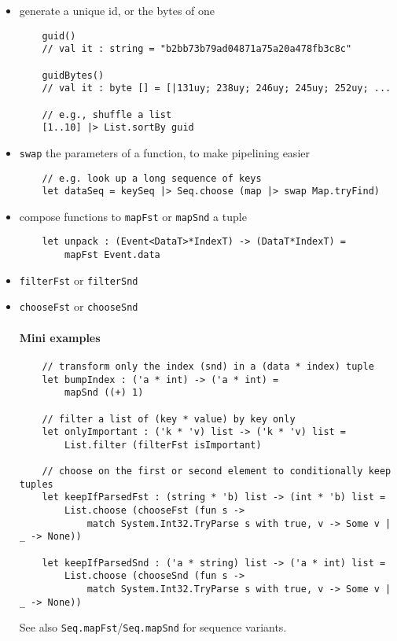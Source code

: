 \documentclass{article}
\begin{document}
\begin{itemize}
\item generate a unique id, or the bytes of one
\begin{verbatim}
    guid()
    // val it : string = "b2bb73b79ad04871a75a20a478fb3c8c"

    guidBytes()
    // val it : byte [] = [|131uy; 238uy; 246uy; 245uy; 252uy; ...

    // e.g., shuffle a list
    [1..10] |> List.sortBy guid
\end{verbatim}


\item \texttt{swap} the parameters of a function, to make pipelining easier
\begin{verbatim}
    // e.g. look up a long sequence of keys
    let dataSeq = keySeq |> Seq.choose (map |> swap Map.tryFind)
\end{verbatim}

\item compose functions to \texttt{mapFst} or \texttt{mapSnd} a tuple
\begin{verbatim}
    let unpack : (Event<DataT>*IndexT) -> (DataT*IndexT) =
        mapFst Event.data
\end{verbatim}

\item \texttt{filterFst} or \texttt{filterSnd}

\item \texttt{chooseFst} or \texttt{chooseSnd}

\paragraph{Mini examples}
\begin{verbatim}
    // transform only the index (snd) in a (data * index) tuple
    let bumpIndex : ('a * int) -> ('a * int) =
        mapSnd ((+) 1)

    // filter a list of (key * value) by key only
    let onlyImportant : ('k * 'v) list -> ('k * 'v) list =
        List.filter (filterFst isImportant)

    // choose on the first or second element to conditionally keep tuples
    let keepIfParsedFst : (string * 'b) list -> (int * 'b) list =
        List.choose (chooseFst (fun s ->
            match System.Int32.TryParse s with true, v -> Some v | _ -> None))

    let keepIfParsedSnd : ('a * string) list -> ('a * int) list =
        List.choose (chooseSnd (fun s ->
            match System.Int32.TryParse s with true, v -> Some v | _ -> None))
\end{verbatim}
\noindent See also \texttt{Seq.mapFst}/\texttt{Seq.mapSnd} for sequence variants.

\end{itemize}
\end{document}
